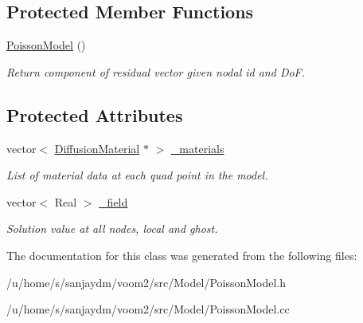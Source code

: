 \subsection*{Protected Member Functions}
\begin{DoxyCompactItemize}
\item 
\hypertarget{classvoom_1_1_poisson_model_a3e6a10280942063968d9fb80fade83c4}{
\hyperlink{classvoom_1_1_poisson_model_a3e6a10280942063968d9fb80fade83c4}{PoissonModel} ()}
\label{classvoom_1_1_poisson_model_a3e6a10280942063968d9fb80fade83c4}

\begin{DoxyCompactList}\small\item\em Return component of residual vector given nodal id and DoF. \item\end{DoxyCompactList}\end{DoxyCompactItemize}
\subsection*{Protected Attributes}
\begin{DoxyCompactItemize}
\item 
\hypertarget{classvoom_1_1_poisson_model_aa719cf6337a762f803f389ad39192057}{
vector$<$ \hyperlink{classvoom_1_1_diffusion_material}{DiffusionMaterial} $\ast$ $>$ \hyperlink{classvoom_1_1_poisson_model_aa719cf6337a762f803f389ad39192057}{\_\-materials}}
\label{classvoom_1_1_poisson_model_aa719cf6337a762f803f389ad39192057}

\begin{DoxyCompactList}\small\item\em List of material data at each quad point in the model. \item\end{DoxyCompactList}\item 
\hypertarget{classvoom_1_1_poisson_model_af09bf3fbb7500cf5ee7547cd26ee7cb0}{
vector$<$ Real $>$ \hyperlink{classvoom_1_1_poisson_model_af09bf3fbb7500cf5ee7547cd26ee7cb0}{\_\-field}}
\label{classvoom_1_1_poisson_model_af09bf3fbb7500cf5ee7547cd26ee7cb0}

\begin{DoxyCompactList}\small\item\em Solution value at all nodes, local and ghost. \item\end{DoxyCompactList}\end{DoxyCompactItemize}


The documentation for this class was generated from the following files:\begin{DoxyCompactItemize}
\item 
/u/home/s/sanjaydm/voom2/src/Model/PoissonModel.h\item 
/u/home/s/sanjaydm/voom2/src/Model/PoissonModel.cc\end{DoxyCompactItemize}
